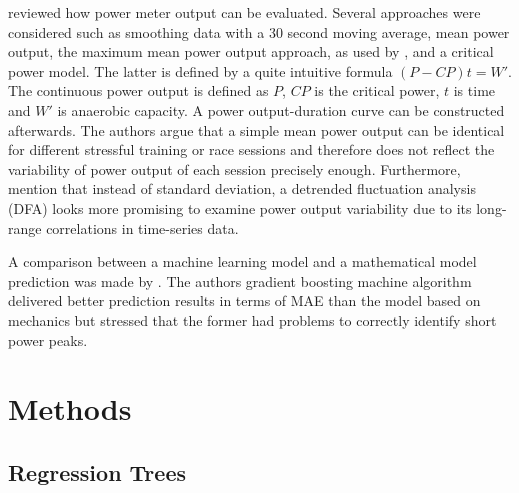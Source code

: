 \documentclass[12pt,a4paper]{article}
\begin{document}
\textcite{Passfield2016} reviewed how power meter output can be evaluated. Several approaches were considered such as smoothing data with a 30 second moving average, mean power output, the maximum mean power output approach, as used by \textcite{Karetnikov2019}, and a critical power model. The latter is defined by a quite intuitive formula \((P-CP)t = W'\). The continuous power output is defined as \(P\), \(CP\) is the critical power, \(t\) is time and \(W'\) is anaerobic capacity. A power output-duration curve can be constructed afterwards. The authors argue that a simple mean power output can be identical for different stressful training or race sessions and therefore does not reflect the variability of power output of each session precisely enough. Furthermore, \textcite{Passfield2016} mention that instead of standard deviation, a detrended fluctuation analysis (DFA) looks more promising to examine power output variability due to its long-range correlations in time-series data.

A comparison between a machine learning model and a mathematical model prediction was made by \textcite{Lemaitre2018}. The authors gradient boosting machine algorithm delivered better prediction results in terms of MAE than the model based on mechanics but stressed that the former had problems to correctly identify short power peaks.

\hypertarget{methods}{%
\section{\texorpdfstring{Methods \label{sec:methods}}{Methods }}\label{methods}}

\hypertarget{regression-trees}{%
\subsection{Regression Trees}\label{regression-trees}}
\end{document}
